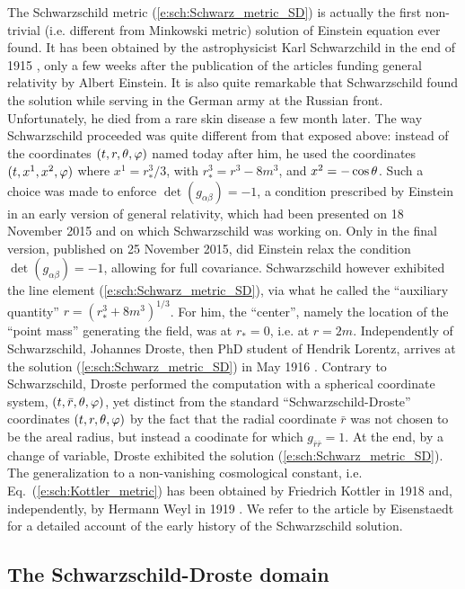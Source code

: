 \begin{hist}
The Schwarzschild metric (\ref{e:sch:Schwarz_metric_SD}) is actually
the first non-trivial (i.e. different from Minkowski metric) solution
of Einstein equation ever found. It has been obtained by the
astrophysicist Karl Schwarzchild in the end of 1915 \cite{Schwa1916}, only a few weeks
after the publication of the articles funding general relativity by
Albert Einstein. It is also quite remarkable that
Schwarzschild found the solution while serving in the German army at the Russian
front. Unfortunately, he died from a rare skin disease a few month later.
The way Schwarzschild proceeded was quite different from that exposed above:
instead of the coordinates $(t,r,\theta,\varphi)$
named today after him, he used the coordinates
$(t,x^1,x^2,\varphi)$ where $x^1 = r_*^3/3$, with $r_*^3 = r^3-8m^3$, and
$x^2 = -\cos\theta$. Such a choice was made to enforce $\det(g_{\alpha\beta}) = -1$, a condition
prescribed by Einstein in an early version of general relativity, which had been presented on
18 November 2015 and on which Schwarzschild was working on. Only in the final version, published on
25 November 2015, did Einstein relax the condition $\det(g_{\alpha\beta}) = -1$, allowing for full
covariance. Schwarzschild however
exhibited the line element (\ref{e:sch:Schwarz_metric_SD}), via what he
called the ``auxiliary quantity'' $r = (r_*^3 + 8m^3)^{1/3}$.
For him, the ``center'',  namely the location of the ``point mass'' generating the field,
was at $r_* = 0$, i.e. at $r=2m$.
Independently of Schwarzschild, Johannes Droste, then PhD student of
Hendrik Lorentz,
arrives at the solution (\ref{e:sch:Schwarz_metric_SD}) in May 1916 \cite{Drost1917}.
Contrary to Schwarzschild, Droste performed the computation with
a spherical coordinate system, $(t,\bar r, \theta,\varphi)$, yet distinct from
the standard ``Schwarzschild-Droste'' coordinates $(t,r,\theta,\varphi)$ by the fact that the radial
coordinate $\bar r$ was not chosen to be the areal radius, but instead a
coodinate for which $g_{\bar r\bar r} = 1$. At the end, by a change of
variable, Droste exhibited the solution (\ref{e:sch:Schwarz_metric_SD}).
The generalization to a non-vanishing cosmological constant, i.e.
Eq.~(\ref{e:sch:Kottler_metric}) has been obtained by
Friedrich Kottler in 1918 \cite{Kottl1918} and, independently, by
Hermann Weyl in 1919 \cite{Weyl1919}. We refer to the article by Eisenstaedt
\cite{Eisen82} for a detailed account of the early history of the
Schwarzschild solution.
\end{hist}


\subsection{The Schwarzschild-Droste domain} \label{s:sch:SD_domain}

